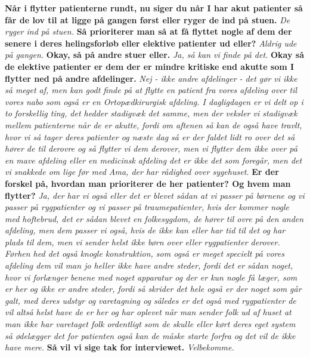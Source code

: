 \textbf{Når i flytter patienterne rundt, nu siger du når I har akut patienter så får de lov til at ligge på gangen først eller ryger de ind på stuen.}
\textit{De ryger ind på stuen.}
\textbf{Så prioriterer man så at få flyttet nogle af dem der senere i deres helingsforløb eller elektive patienter ud eller?}
\textit{ Aldrig ude på gangen.}
\textbf{Okay, så på andre stuer eller.}
\textit{Ja, så kan vi finde på det.}
\textbf{Okay så de elektive patienter er dem der er mindre kritiske end akutte som I flytter ned på andre afdelinger.} 
\textit{Nej - ikke andre afdelinger - det gør vi ikke så meget af, men kan godt finde på at flytte en patient fra vores afdeling over til vores nabo som også er en Ortopædkirurgisk afdeling. I dagligdagen er vi delt op i to forskellig ting, det hedder stadigvæk det samme, men der veksler vi stadigvæk mellem patienterne når de er akutte, fordi om aftenen så kan de også have travlt, hvor vi så tager deres patienter og næste dag så er der faldet lidt ro over det så hører de til derovre og så flytter vi dem derover, men vi flytter dem ikke over på en mave afdeling eller en medicinsk afdeling det er ikke det som foregår, men det vi snakkede om lige før med Ama, der har rådighed over sygehuset.}
\textbf{Er der forskel på, hvordan man prioriterer de her patienter? Og hvem man flytter?}
\textit{Ja, der har vi også eller det er blevet sådan at vi passer på børnene og vi passer på rygpatienter og vi passer på traumepatienter, hvis der kommer nogle med hoftebrud, det er sådan blevet en folkesygdom, de hører til ovre på den anden afdeling, men dem passer vi også, hvis de ikke kan eller har tid til det og har plads til dem, men vi sender helst ikke børn over eller rygpatienter derover. Førhen hed det også knogle konstruktion, som også er meget specielt på vores afdeling dem vil man jo heller ikke have andre steder, fordi det er sådan noget, hvor vi forlænger benene med noget apparatur og der er kun nogle få læger, som er her og ikke er andre steder, fordi så skrider det hele også er der noget som går galt, med deres udstyr og varetagning og således er det også med rygpatienter de vil altså helst have de er her og har oplevet når man sender folk ud af huset at man ikke har varetaget folk ordentligt som de skulle eller kørt deres eget system så ødelægger det for patienten også kan de måske starte forfra og det vil de ikke have mere.}   
\textbf{Så vil vi sige tak for interviewet.}
\textit{Velbekomme.}


